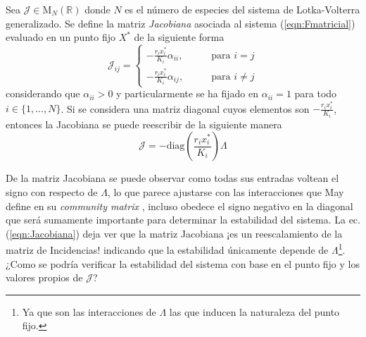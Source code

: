 \begin{definición}\label{def:MatrizJacobiana}
	Sea $\mathcal{J}\in\mathrm{M}_N(\mathbb{R})$ donde $N$ es el número de especies del sistema de Lotka-Volterra generalizado. Se define la matriz \textit{Jacobiana} asociada al sistema (\ref{eqn:Fmatricial}) evaluado en un punto fijo $X^*$ de la siguiente forma
	\begin{equation}\label{eqn:MartizJacobiana}
		\mathcal{J}_{ij}=\begin{cases}
			-\frac{r_ix_i^*}{K_i}\alpha_{ii},\qquad&\text{para }i=j\\
			-\frac{r_ix_i^*}{K_i}\alpha_{ij},\qquad&\text{para }i\neq j
		\end{cases}
	\end{equation}
	considerando que $\alpha_{ii}>0$ y particularmente se ha fijado en $\alpha_{ii}=1$ para todo $i\in\{1,...,N\}$. Si se considera una matriz diagonal cuyos elementos son $-\frac{r_ix_i^*}{K_i}$, entonces la Jacobiana se puede reescribir de la siguiente manera
	\begin{equation}\label{eqn:Jacobiana}
		\mathcal{J}=-\text{diag}\left (\frac{r_ix_i^*}{K_i}\right )\Lambda
	\end{equation}
\end{definición}
De la matriz Jacobiana se puede observar como todas sus entradas voltean el signo con respecto de $\Lambda$, lo que parece ajustarse con las interacciones que May define en su \textit{community matrix} \cite{may2019stability}, incluso obedece el signo negativo en la diagonal que será sumamente importante para determinar la estabilidad del sistema. La ec. (\ref{eqn:Jacobiana}) deja ver que la matriz Jacobiana ¡es un reescalamiento de la matriz de Incidencias! indicando que la estabilidad únicamente depende de $\Lambda$\footnote{Ya que son las interacciones de $\Lambda$ las que inducen la naturaleza del punto fijo.}. ¿Como se podría verificar la estabilidad del sistema con base en el punto fijo y los valores propios de $\mathcal{J}$?

